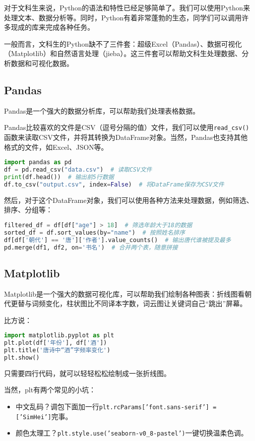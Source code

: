 \documentclass[../main.tex]{subfiles}
\begin{document}
对于文科生来说，Python的语法和特性已经足够简单了。我们可以使用Python来处理文本、数据分析等。同时，Python有着非常蓬勃的生态，同学们可以调用许多现成的库来完成各种任务。

一般而言，文科生的Python缺不了三件套：超级Excel（Pandas）、数据可视化（Matplotlib）和自然语言处理（jieba）。这三件套可以帮助文科生处理数据、分析数据和可视化数据。

\subsection{Pandas}

Pandas是一个强大的数据分析库，可以帮助我们处理表格数据。

Pandas比较喜欢的文件是CSV（逗号分隔的值）文件，我们可以使用\texttt{read\_csv()}函数来读取CSV文件，并将其转换为DataFrame对象。当然，Pandas也支持其他格式的文件，如Excel、JSON等。

\begin{lstlisting}[language=python]
import pandas as pd
df = pd.read_csv("data.csv")  # 读取CSV文件
print(df.head())  # 输出前5行数据
df.to_csv("output.csv", index=False)  # 将DataFrame保存为CSV文件
\end{lstlisting}

然后，对于这个DataFrame对象，我们可以使用各种方法来处理数据，例如筛选、排序、分组等：
\begin{lstlisting}[language=python]
filtered_df = df[df["age"] > 18]  # 筛选年龄大于18的数据
sorted_df = df.sort_values(by="name")  # 按照姓名排序
df[df['朝代'] == '唐']['作者'].value_counts()  # 输出唐代谁被提及最多
pd.merge(df1, df2, on='书名')  # 合并两个表，随意拼接
\end{lstlisting}

\subsection{Matplotlib}

Matplotlib是一个强大的数据可视化库，可以帮助我们绘制各种图表：折线图看朝代更替与词频变化，柱状图比不同译本字数，词云图让关键词自己“跳出”屏幕。

比方说：
\begin{lstlisting}[language=python]
import matplotlib.pyplot as plt
plt.plot(df['年份'], df['酒'])
plt.title('唐诗中“酒”字频率变化')
plt.show()
\end{lstlisting}

只需要四行代码，就可以轻轻松松绘制成一张折线图。

当然，plt有两个常见的小坑：
\begin{itemize}
    \item 中文乱码？调包下面加一行\texttt{plt.rcParams['font.sans-serif'] = ['SimHei']}完事。
    \item 颜色太理工？\texttt{plt.style.use('seaborn-v0\_8-pastel')}一键切换温柔色调。
\end{itemize}
\end{document}
